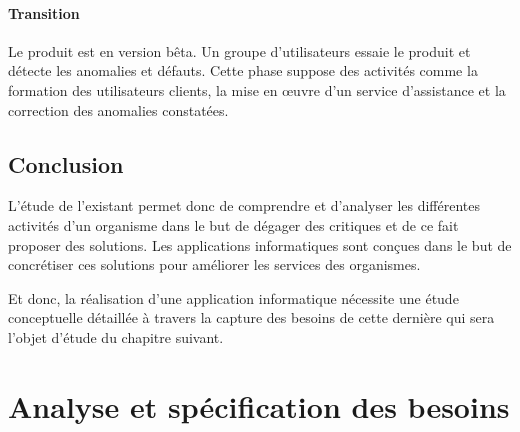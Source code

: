 \documentclass{report}
\begin{document}
\subsubsection{Transition}
Le produit est en version bêta. Un groupe d'utilisateurs essaie le produit et détecte les anomalies et défauts. Cette phase suppose des activités comme la formation des utilisateurs clients, la mise en œuvre d'un service d'assistance et la correction des anomalies constatées.

\section{Conclusion}
L’étude de l’existant permet donc de comprendre et d’analyser les différentes activités d'un organisme dans le but de dégager des critiques et de ce fait proposer des solutions. Les applications informatiques sont conçues dans le but de concrétiser ces solutions pour améliorer les services des organismes.

Et donc, la réalisation d’une application informatique nécessite une étude conceptuelle détaillée à travers la capture des besoins de cette dernière qui sera l’objet d'étude du chapitre suivant.

\chapter{Analyse et spécification des besoins}
\end{document}
